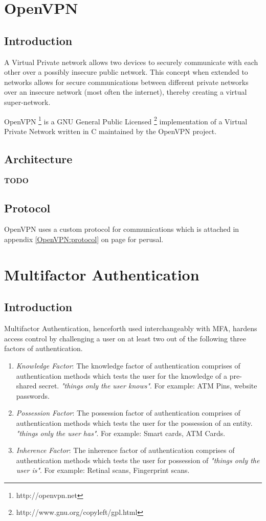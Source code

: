 \documentclass[11pt,oneside]{book}
\begin{document}
\mainmatter

\chapter{OpenVPN}
\section{Introduction}
A Virtual Private network allows two devices to securely communicate with each other
over a possibly insecure public network. This concept when extended to networks
allows for secure communications between different private networks over an
insecure network (most often the internet), thereby creating a virtual super-network.

OpenVPN \footnote{http://openvpn.net} is a GNU General Public
Licensed \footnote{http://www.gnu.org/copyleft/gpl.html} implementation of a
Virtual Private Network written in C maintained by the OpenVPN project.

\section{Architecture}
\textbf{TODO}

\section{Protocol}
OpenVPN uses a custom protocol for communications which is attached in appendix
\ref{OpenVPN:protocol} on page \pageref{OpenVPN:protocol} for perusal.

\chapter{Multifactor Authentication}
\section{Introduction}
Multifactor Authentication, henceforth used interchangeably with MFA, hardens access control
by challenging a user on at least two out of the following three factors of authentication.

\begin{enumerate}
    \item \emph{Knowledge Factor}: The knowledge factor of authentication comprises of
        authentication methods which tests the user for the knowledge of a pre-shared secret.
        \emph{"things only the user knows"}. For example: ATM Pins, website passwords.
    \item \emph{Possession Factor}: The possession factor of authentication comprises of
        authentication methods which tests the user for the possession of an entity.
        \emph{"things only the user has"}. For example: Smart cards, ATM Cards.
    \item \emph{Inherence Factor}: The inherence factor of authentication comprises of
        authentication methods which tests the user for possession of \emph{"things only
        the user is"}. For example: Retinal scans, Fingerprint scans.
\end{enumerate}
\end{document}
